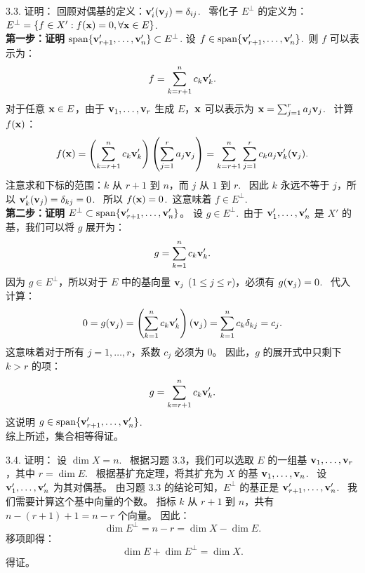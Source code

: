 \begin{exer}
3.3. 证明：
回顾对偶基的定义：$\mathbf{v}'_i(\mathbf{v}_j) = \delta_{ij}$.~
零化子 $E^\perp$ 的定义为：$E^\perp = \{ f \in X' : f(\mathbf{x}) = 0, \forall \mathbf{x} \in E \}$.~
\\
\textbf{第一步：证明 $\operatorname{span}\{\mathbf{v}'_{r+1}, \dots, \mathbf{v}'_n\} \subset E^\perp$}.
设 $f \in \operatorname{span}\{\mathbf{v}'_{r+1}, \dots, \mathbf{v}'_n\}$.~则 $f$ 可以表示为：
$$ f = \sum_{k=r+1}^n c_k \mathbf{v}'_k. $$
对于任意 $\mathbf{x} \in E$，由于 $\mathbf{v}_1, \dots, \mathbf{v}_r$ 生成 $E$，$\mathbf{x}$ 可以表示为 $\mathbf{x} = \sum_{j=1}^r a_j \mathbf{v}_j$.~
计算 $f(\mathbf{x})$：
$$ f(\mathbf{x}) = \left( \sum_{k=r+1}^n c_k \mathbf{v}'_k \right) \left( \sum_{j=1}^r a_j \mathbf{v}_j \right) = \sum_{k=r+1}^n \sum_{j=1}^r c_k a_j \mathbf{v}'_k(\mathbf{v}_j). $$
注意求和下标的范围：$k$ 从 $r+1$ 到 $n$，而 $j$ 从 $1$ 到 $r$.~
因此 $k$ 永远不等于 $j$，所以 $\mathbf{v}'_k(\mathbf{v}_j) = \delta_{kj} = 0$.~
所以 $f(\mathbf{x}) = 0$.~这意味着 $f \in E^\perp$.~
\\
\textbf{第二步：证明 $E^\perp \subset \operatorname{span}\{\mathbf{v}'_{r+1}, \dots, \mathbf{v}'_n\}$}。
设 $g \in E^\perp$.~由于 $\mathbf{v}'_1, \dots, \mathbf{v}'_n$ 是 $X'$ 的基，我们可以将 $g$ 展开为：
$$ g = \sum_{k=1}^n c_k \mathbf{v}'_k. $$
因为 $g \in E^\perp$，所以对于 $E$ 中的基向量 $\mathbf{v}_j$ ($1 \le j \le r$)，必须有 $g(\mathbf{v}_j) = 0$.~
代入计算：
$$ 0 = g(\mathbf{v}_j) = \left( \sum_{k=1}^n c_k \mathbf{v}'_k \right) (\mathbf{v}_j) = \sum_{k=1}^n c_k \delta_{kj} = c_j. $$
这意味着对于所有 $j = 1, \dots, r$，系数 $c_j$ 必须为 0。
因此，$g$ 的展开式中只剩下 $k > r$ 的项：
$$ g = \sum_{k=r+1}^n c_k \mathbf{v}'_k. $$
这说明 $g \in \operatorname{span}\{\mathbf{v}'_{r+1}, \dots, \mathbf{v}'_n\}$.~
\\
综上所述，集合相等得证。

3.4. 证明：
设 $\dim X = n$.~
根据习题 3.3，我们可以选取 $E$ 的一组基 $\mathbf{v}_1, \dots, \mathbf{v}_r$，其中 $r = \dim E$.~
根据基扩充定理，将其扩充为 $X$ 的基 $\mathbf{v}_1, \dots, \mathbf{v}_n$.~
设 $\mathbf{v}'_1, \dots, \mathbf{v}'_n$ 为其对偶基。
由习题 3.3 的结论可知，$E^\perp$ 的基正是 $\mathbf{v}'_{r+1}, \dots, \mathbf{v}'_n$.~
我们需要计算这个基中向量的个数。
指标 $k$ 从 $r+1$ 到 $n$，共有 $n - (r+1) + 1 = n - r$ 个向量。
因此：
$$ \dim E^\perp = n - r = \dim X - \dim E. $$
移项即得：
$$ \dim E + \dim E^\perp = \dim X. $$
得证。



\vspace{5ex}


\end{exer}
